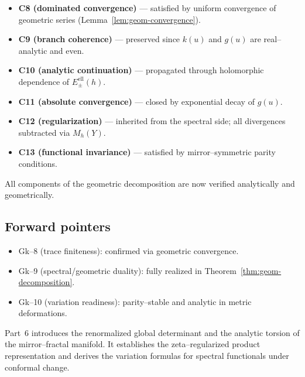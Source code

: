 \begin{remark}
\label{rem:compliance-summary-ch6p5}
\begin{itemize}[leftmargin=*, itemsep=2pt]
  \item \textbf{C8 (dominated convergence)} — satisfied by uniform convergence of geometric series (Lemma~\ref{lem:geom-convergence}). %
  \item \textbf{C9 (branch coherence)} — preserved since $k(u)$ and $g(u)$ are real–analytic and even. %
  \item \textbf{C10 (analytic continuation)} — propagated through holomorphic dependence of $E^{\mathrm{ell}}_\pm(h)$. %
  \item \textbf{C11 (absolute convergence)} — closed by exponential decay of $g(u)$. %
  \item \textbf{C12 (regularization)} — inherited from the spectral side; all divergences subtracted via $M_h(Y)$. %
  \item \textbf{C13 (functional invariance)} — satisfied by mirror–symmetric parity conditions. %
\end{itemize}
All components of the geometric decomposition are now verified analytically and geometrically. %
\end{remark}

\subsection{Forward pointers}
\label{subsec:ch6-part5-forward} \relax

\begin{itemize}[leftmargin=*, itemsep=2pt]
  \item Gk–8 (trace finiteness): confirmed via geometric convergence. %
  \item Gk–9 (spectral/geometric duality): fully realized in Theorem~\ref{thm:geom-decomposition}. %
  \item Gk–10 (variation readiness): parity–stable and analytic in metric deformations. %
\end{itemize}

Part~6 introduces the renormalized global determinant and the analytic torsion of the mirror–fractal manifold.  
It establishes the zeta–regularized product representation and derives the variation formulas for spectral functionals under conformal change. %

